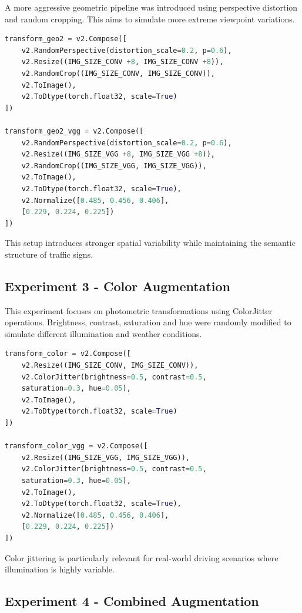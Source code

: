 \documentclass[conference,a4paper]{IEEEtran}
\begin{document}
A more aggressive geometric pipeline was introduced using perspective distortion and random cropping. This aims to simulate more extreme viewpoint variations.

\begin{lstlisting}[language=Python]
transform_geo2 = v2.Compose([
    v2.RandomPerspective(distortion_scale=0.2, p=0.6),
    v2.Resize((IMG_SIZE_CONV +8, IMG_SIZE_CONV +8)),
    v2.RandomCrop((IMG_SIZE_CONV, IMG_SIZE_CONV)),
    v2.ToImage(),
    v2.ToDtype(torch.float32, scale=True)
])

transform_geo2_vgg = v2.Compose([
    v2.RandomPerspective(distortion_scale=0.2, p=0.6),
    v2.Resize((IMG_SIZE_VGG +8, IMG_SIZE_VGG +8)),
    v2.RandomCrop((IMG_SIZE_VGG, IMG_SIZE_VGG)),
    v2.ToImage(),
    v2.ToDtype(torch.float32, scale=True),
    v2.Normalize([0.485, 0.456, 0.406],
    [0.229, 0.224, 0.225])
])
\end{lstlisting}

This setup introduces stronger spatial variability while maintaining the semantic structure of traffic signs.

\subsection{Experiment 3 - Color Augmentation}

This experiment focuses on photometric transformations using ColorJitter operations. Brightness, contrast, saturation and hue were randomly modified to simulate different illumination and weather conditions.

\begin{lstlisting}[language=Python]
transform_color = v2.Compose([
    v2.Resize((IMG_SIZE_CONV, IMG_SIZE_CONV)),
    v2.ColorJitter(brightness=0.5, contrast=0.5,
    saturation=0.3, hue=0.05),
    v2.ToImage(),
    v2.ToDtype(torch.float32, scale=True)
])

transform_color_vgg = v2.Compose([
    v2.Resize((IMG_SIZE_VGG, IMG_SIZE_VGG)),
    v2.ColorJitter(brightness=0.5, contrast=0.5,
    saturation=0.3, hue=0.05),
    v2.ToImage(),
    v2.ToDtype(torch.float32, scale=True),
    v2.Normalize([0.485, 0.456, 0.406],
    [0.229, 0.224, 0.225])
])
\end{lstlisting}

Color jittering is particularly relevant for real-world driving scenarios where illumination is highly variable.

\subsection{Experiment 4 - Combined Augmentation}
\end{document}
